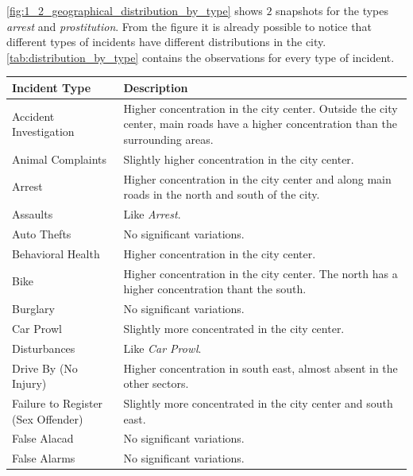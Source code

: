 \cref{fig:1_2_geographical_distribution_by_type} shows $2$ snapshots for the types \textit{arrest} and \textit{prostitution}.
From the figure it is already possible to notice that different types of incidents have different distributions in the city.
\cref{tab:distribution_by_type} contains the observations for every type of incident.

\renewcommand{\arraystretch}{1.5}
\begin{longtable}{ | >{\arraybackslash} m{5cm} | >{\arraybackslash} m{10cm} | }
    \hline
    \textbf{Incident Type} & \textbf{Description} \\
    \hline
    Accident Investigation  &   Higher concentration in the city center. Outside the city center, main roads have a higher concentration than the surrounding areas. \\
    \hline        
    Animal Complaints       &   Slightly higher concentration in the city center. \\
    \hline
    Arrest                  &   Higher concentration in the city center and along main roads in the north and south of the city. \\
    \hline
    Assaults                &   Like \textit{Arrest}. \\
    \hline
    Auto Thefts             &   No significant variations. \\
    \hline
    Behavioral Health       &   Higher concentration in the city center. \\
    \hline
    Bike                    &   Higher concentration in the city center. The north has a higher concentration thant the south. \\
    \hline
    Burglary                &   No significant variations. \\
    \hline
    Car Prowl               &   Slightly more concentrated in the city center. \\
    \hline
    Disturbances            &   Like \textit{Car Prowl}. \\
    \hline
    Drive By (No Injury)    &   Higher concentration in south east, almost absent in the other sectors. \\
    \hline
    Failure to Register (Sex Offender) &   Slightly more concentrated in the city center and south east. \\
    \hline
    False Alacad            &   No significant variations. \\
    \hline
    False Alarms            &   No significant variations. \\

\end{longtable}
